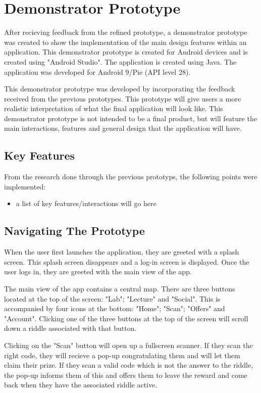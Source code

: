 \documentclass[10pt,twocolumn]{article} %
\begin{document}
\section*{Demonstrator Prototype}

After recieving feedback from the refined prototype, a demonstrator prototype was created to show the implementation of the main design features within an application. This demonstrator prototype is created for Android devices and is created using "Android Studio". The application is created using Java. The application was developed for Android 9/Pie (API level 28).

This demonstrator prototype was developed by incorporating the feedback received from the previous prototypes. This prototype will give users a more realistic interpretation of what the final application will look like. This demonstrator prototype is not intended to be a final product, but will feature the main interactions, features and general design that the application will have.

\subsection*{Key Features}
From the research done through the previous prototyps, the following points were implemented:

\begin{itemize}[noitemsep]
  \item a list of key features/interactions will go here
\end{itemize}

\subsection*{Navigating The Prototype}
When the user first launches the application, they are greeted with a splash screen. This splash screen disappears and a log-in screen is displayed. Once the user logs in, they are greeted with the main view of the app.

The main view of the app contains a central map. There are three buttons located at the top of the screen: "Lab"; "Lecture" and "Social". This is accompanied by four icons at the bottom: "Home";  "Scan"; "Offers" and "Account". Clicking one of the three buttons at the top of the screen will scroll down a riddle associated with that button.

Clicking on the "Scan" button will open up a fullscreen scanner. If they scan the right code, they will recieve a pop-up congratulating them and will let them claim their prize. If they scan a valid code which is not the answer to the riddle, the pop-up informs them of this and offers them to leave the reward and come back when they have the associated riddle active.
\end{document}
